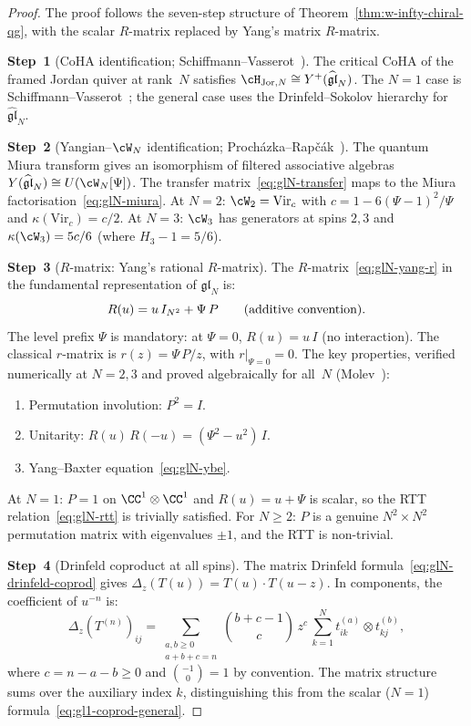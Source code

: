 \begin{proof}
The proof follows the seven-step structure of
Theorem~\ref{thm:w-infty-chiral-qg}, with the scalar
$R$-matrix replaced by Yang's matrix $R$-matrix.

\medskip
\noindent
\textbf{Step~1}
(CoHA identification; Schiffmann--Vasserot~\cite{SV13}).
The critical CoHA of the framed Jordan quiver at
rank~$N$ satisfies
$\cH_{\mathrm{Jor},N} \cong Y^+(\widehat{\mathfrak{gl}}_N)$.
The $N = 1$ case is
Schiffmann--Vasserot~\cite{SV13}; the general case
uses the Drinfeld--Sokolov hierarchy for
$\widehat{\mathfrak{gl}}_N$.

\medskip
\noindent
\textbf{Step~2}
(Yangian--$\cW_N$ identification;
Proch\'azka--Rap\v{c}\'ak~\cite{PR19}).
The quantum Miura transform gives an isomorphism of
filtered associative algebras
$Y(\widehat{\mathfrak{gl}}_N) \cong U(\cW_N[\Psi])$.
The transfer matrix~\eqref{eq:glN-transfer}
maps to the Miura
factorisation~\eqref{eq:glN-miura}.
At $N = 2$: $\cW_2 = \mathrm{Vir}_c$ with
$c = 1 - 6(\Psi - 1)^2/\Psi$ and
$\kappa(\mathrm{Vir}_c) = c/2$.
At $N = 3$: $\cW_3$ has generators at spins $2, 3$ and
$\kappa(\cW_3) = 5c/6$ (where $H_3 - 1 = 5/6$).

\medskip
\noindent
\textbf{Step~3}
($R$-matrix: Yang's rational $R$-matrix).
The $R$-matrix~\eqref{eq:glN-yang-r} in the fundamental
representation of $\mathfrak{gl}_N$ is:
\[
  R(u) = u\, I_{N^2} + \Psi\, P
  \qquad \textup{(additive convention)}.
\]
The level prefix $\Psi$ is mandatory: at $\Psi = 0$,
$R(u) = u\, I$ (no interaction). The classical
$r$-matrix is $r(z) = \Psi\, P/z$, with
$r|_{\Psi = 0} = 0$.
The key properties, verified numerically at $N = 2, 3$ and
proved algebraically for all~$N$
(Molev~\cite{Molev07}):
\begin{enumerate}[label=\textup{(\roman*)}]
\item Permutation involution: $P^2 = I$.
\item Unitarity: $R(u)\, R(-u) = (\Psi^2 - u^2)\, I$.
\item Yang--Baxter equation~\eqref{eq:glN-ybe}.
\end{enumerate}
At $N = 1$: $P = 1$ on $\CC^1 \otimes \CC^1$ and
$R(u) = u + \Psi$ is scalar, so the RTT
relation~\eqref{eq:glN-rtt} is trivially satisfied.
For $N \geq 2$: $P$ is a genuine $N^2 \times N^2$
permutation matrix with eigenvalues $\pm 1$, and the
RTT is non-trivial.

\medskip
\noindent
\textbf{Step~4}
(Drinfeld coproduct at all spins).
The matrix Drinfeld
formula~\eqref{eq:glN-drinfeld-coprod} gives
$\Delta_z(T(u)) = T(u) \cdot T(u - z)$. In components,
the coefficient of $u^{-n}$ is:
\[
  \Delta_z(T^{(n)})_{ij}
  = \sum_{\substack{a,b \geq 0 \\ a+b+c = n}}
  \binom{b+c-1}{c}\, z^c\,
  \sum_{k=1}^{N}
  t_{ik}^{(a)} \otimes t_{kj}^{(b)},
\]
where $c = n - a - b \geq 0$ and
$\binom{-1}{0} = 1$ by convention. The matrix structure
sums over the auxiliary index $k$, distinguishing this from
the scalar ($N = 1$) formula~\eqref{eq:gl1-coprod-general}.


\end{proof}

